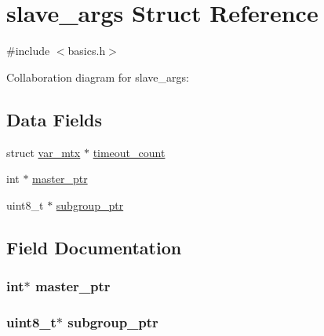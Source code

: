 \hypertarget{structslave__args}{}\section{slave\+\_\+args Struct Reference}
\label{structslave__args}


{\ttfamily \#include $<$basics.\+h$>$}



Collaboration diagram for slave\+\_\+args\+:
\subsection*{Data Fields}
\begin{DoxyCompactItemize}
\item 
struct \hyperlink{structvar__mtx}{var\+\_\+mtx} $\ast$ \hyperlink{structslave__args_add28ebd6d6bfc427a68f158adda7f98b}{timeout\+\_\+count}
\item 
int $\ast$ \hyperlink{structslave__args_a48820d515e4026cd0e2f82fdfd234ba2}{master\+\_\+ptr}
\item 
uint8\+\_\+t $\ast$ \hyperlink{structslave__args_a99611142a787c12c65c0c40f5ec3bc35}{subgroup\+\_\+ptr}
\end{DoxyCompactItemize}


\subsection{Field Documentation}
\hypertarget{structslave__args_a48820d515e4026cd0e2f82fdfd234ba2}{}
\subsubsection[{master\+\_\+ptr}]{\setlength{\rightskip}{0pt plus 5cm}int$\ast$ master\+\_\+ptr}\label{structslave__args_a48820d515e4026cd0e2f82fdfd234ba2}
\hypertarget{structslave__args_a99611142a787c12c65c0c40f5ec3bc35}{}
\subsubsection[{subgroup\+\_\+ptr}]{\setlength{\rightskip}{0pt plus 5cm}uint8\+\_\+t$\ast$ subgroup\+\_\+ptr}\label{structslave__args_a99611142a787c12c65c0c40f5ec3bc35}
\hypertarget{structslave__args_add28ebd6d6bfc427a68f158adda7f98b}{}
